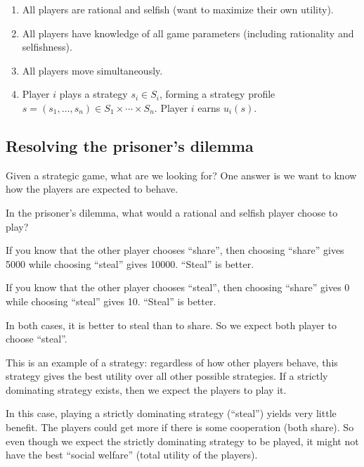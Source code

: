 \documentclass[12pt,letterpaper]{report}
\begin{document}
\begin{enumerate}
  \item
    All players are rational and selfish (want to maximize their own utility).
  \item
    All players have knowledge of all game parameters (including rationality and selfishness).
  \item
    All players move simultaneously.
  \item
    Player $i$ plays a strategy $s_i \in S_i$, forming a strategy profile
    $s = (s_1, \ldots, s_n) \in S_1 \times \cdots \times S_n$.
    Player $i$ earns $u_i(s)$.
\end{enumerate}

\pagebreak
\subsection{Resolving the prisoner's dilemma}

Given a strategic game, what are we looking for?
One answer is we want to know how the players are expected to behave.

In the prisoner's dilemma, what would a rational and selfish player choose to play?

\begin{enumcase}
  \item
    If you know that the other player chooses ``share'', then choosing ``share'' gives 5000 while
    choosing ``steal'' gives 10000.
    ``Steal'' is better.
  \item
    If you know that the other player chooses ``steal'', then choosing ``share'' gives 0 while
    choosing ``steal'' gives 10.
    ``Steal'' is better.
\end{enumcase}

In both cases, it is better to steal than to share.
So we expect both player to choose ``steal''.

This is an example of a  strategy: regardless of how other players
behave, this strategy gives the best utility over all other possible strategies.
If a strictly dominating strategy exists, then we expect the players to play it.

In this case, playing a strictly dominating strategy (``steal'') yields very little benefit.
The players could get more if there is some cooperation (both share).
So even though we expect the strictly dominating strategy to be played, it might not have the best
``social welfare'' (total utility of the players).
\end{document}
